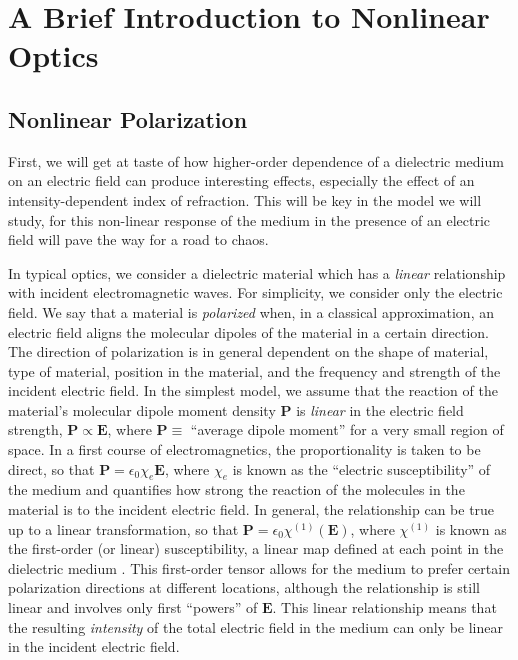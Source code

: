 \documentclass[12pt]{article}
\begin{document}
\section*{A Brief Introduction to Nonlinear Optics}
\subsection*{Nonlinear Polarization}
First, we will get at taste of how higher-order dependence of a dielectric medium on an
electric field can produce interesting effects, especially the effect of an
intensity-dependent index of refraction. This will be key in the model we will study, for
this non-linear response of the medium in the presence of an electric field will pave the
way for a road to chaos.

In typical optics, we consider a dielectric material which has a \textit{linear}
relationship with incident electromagnetic waves. For simplicity, we consider only the
electric field. We say that a material is \textit{polarized} when, in a classical
approximation, an electric field aligns the molecular dipoles of the material in a certain
direction. The direction of polarization is in general dependent on the shape of material,
type of material, position in the material, and the frequency and strength of the incident
electric field. In the simplest model, we assume that the reaction of the material's
molecular dipole moment density $\mathbf{P}$ is \textit{linear} in the electric field
strength, $\mathbf{P} \propto \mathbf{E}$, where $\mathbf{P}\equiv$ ``average dipole
moment'' for a very small region of space. In a first course of electromagnetics, the
proportionality is taken to be direct, so that $\mathbf{P} = \epsilon_0\chi_e \mathbf{E}$,
where $\chi_e$ is known as the ``electric susceptibility'' of the medium \cite{TODO
  GRIFFITHS} and quantifies how strong the reaction of the molecules in the material is to
the incident electric field. In general, the relationship can be true up to a linear
transformation, so that $\mathbf{P} = \epsilon_0\chi^{(1)}(\mathbf{E})$, where $\chi^{(1)}$
is known as the first-order (or linear) susceptibility, a linear map defined at each point
in the dielectric medium \cite{TODO GRIFFITHS}. This first-order tensor allows for the
medium to prefer certain polarization directions at different locations, although the
relationship is still linear and involves only first ``powers'' of $\mathbf{E}$. This linear
relationship means that the resulting \textit{intensity} of the total electric field in the
medium can only be linear in the incident electric field.
\end{document}
